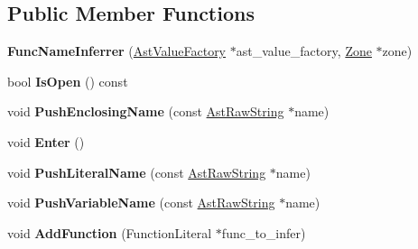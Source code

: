 \subsection*{Public Member Functions}
\begin{DoxyCompactItemize}
\item 
\hypertarget{classv8_1_1internal_1_1_func_name_inferrer_abf5de4a300ebd2d7b400c1a6fd1dc50f}{}{\bfseries Func\+Name\+Inferrer} (\hyperlink{classv8_1_1internal_1_1_ast_value_factory}{Ast\+Value\+Factory} $\ast$ast\+\_\+value\+\_\+factory, \hyperlink{classv8_1_1internal_1_1_zone}{Zone} $\ast$zone)\label{classv8_1_1internal_1_1_func_name_inferrer_abf5de4a300ebd2d7b400c1a6fd1dc50f}

\item 
\hypertarget{classv8_1_1internal_1_1_func_name_inferrer_a3c626832f49fc0a40ebaa1cd1964c253}{}bool {\bfseries Is\+Open} () const \label{classv8_1_1internal_1_1_func_name_inferrer_a3c626832f49fc0a40ebaa1cd1964c253}

\item 
\hypertarget{classv8_1_1internal_1_1_func_name_inferrer_a71629cf92978a0fb0752b23fc9e0899b}{}void {\bfseries Push\+Enclosing\+Name} (const \hyperlink{classv8_1_1internal_1_1_ast_raw_string}{Ast\+Raw\+String} $\ast$name)\label{classv8_1_1internal_1_1_func_name_inferrer_a71629cf92978a0fb0752b23fc9e0899b}

\item 
\hypertarget{classv8_1_1internal_1_1_func_name_inferrer_a10f1720bb184779e004c31205c410827}{}void {\bfseries Enter} ()\label{classv8_1_1internal_1_1_func_name_inferrer_a10f1720bb184779e004c31205c410827}

\item 
\hypertarget{classv8_1_1internal_1_1_func_name_inferrer_ab2bfb7ed805afa622a93d011c7abffae}{}void {\bfseries Push\+Literal\+Name} (const \hyperlink{classv8_1_1internal_1_1_ast_raw_string}{Ast\+Raw\+String} $\ast$name)\label{classv8_1_1internal_1_1_func_name_inferrer_ab2bfb7ed805afa622a93d011c7abffae}

\item 
\hypertarget{classv8_1_1internal_1_1_func_name_inferrer_a0b9bd975bb3de9f0fb992d37191409fd}{}void {\bfseries Push\+Variable\+Name} (const \hyperlink{classv8_1_1internal_1_1_ast_raw_string}{Ast\+Raw\+String} $\ast$name)\label{classv8_1_1internal_1_1_func_name_inferrer_a0b9bd975bb3de9f0fb992d37191409fd}

\item 
\hypertarget{classv8_1_1internal_1_1_func_name_inferrer_a28e663e6a0d31f9aaa19dd9c16ce1089}{}void {\bfseries Add\+Function} (Function\+Literal $\ast$func\+\_\+to\+\_\+infer)\label{classv8_1_1internal_1_1_func_name_inferrer_a28e663e6a0d31f9aaa19dd9c16ce1089}


\end{DoxyCompactItemize}
